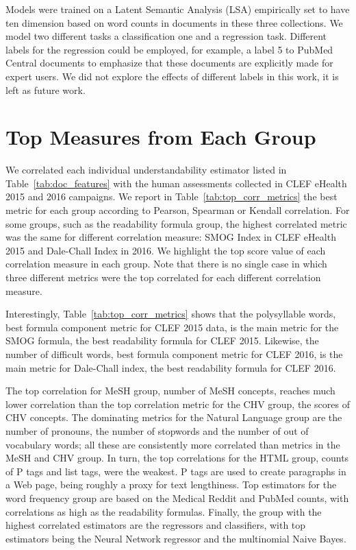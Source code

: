 \documentclass[runningheads,a4paper]{llncs}
\begin{document}
Models were trained on a Latent Semantic Analysis (LSA) empirically set to have ten dimension based on word counts in documents in these three collections.
We model two different tasks a classification one and a regression task.
Different labels for the regression could be employed, for example, a label 5 to PubMed Central documents to emphasize that these documents are explicitly made for expert users.
We did not explore the effects of different labels in this work, it is left as future work.



\section{Top Measures from Each Group}
\label{sec:beyond_readability}

We correlated each individual understandability estimator listed in Table~\ref{tab:doc_features} with the human assessments collected in CLEF eHealth 2015 and 2016 campaigns.
We report in Table~\ref{tab:top_corr_metrics} the best metric for each group according to Pearson, Spearman or Kendall correlation.
For some groups, such as the readability formula group, the highest correlated metric was the same for different correlation measure: SMOG Index in CLEF eHealth 2015 and Dale-Chall Index in 2016. 
We highlight the top score value of each correlation measure in each group. Note that there is no single case in which three different metrics were the top correlated for each different correlation measure.

Interestingly, Table~\ref{tab:top_corr_metrics} shows that the polysyllable words, best formula component metric for CLEF 2015 data, is the main metric for the SMOG formula, the best readability formula for CLEF 2015. 
Likewise, the number of difficult words, best formula component metric for CLEF 2016, is the main metric for Dale-Chall index, the best readability formula for CLEF 2016.

The top correlation for MeSH group, number of MeSH concepts, reaches much lower correlation than the top correlation metric for the CHV group, the scores of CHV concepts.
The dominating metrics for the Natural Language group are the number of pronouns, the number of stopwords and the number of out of vocabulary words; all these are consistently more correlated than metrics in the MeSH and CHV group.
In turn, the top correlations for the HTML group, counts of P tags and list tags, were the weakest. P tags are used to create paragraphs in a Web page, being roughly a proxy for text lengthiness. 
Top estimators for the word frequency group are based on the Medical Reddit and PubMed counts, with correlations as high as the readability formulas.
Finally, the group with the highest correlated estimators are the regressors and classifiers, with top estimators being the Neural Network regressor and the multinomial Naive Bayes.
%

%
\end{document}
